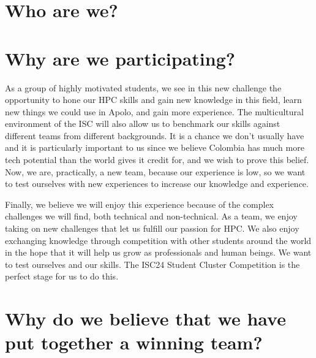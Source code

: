 \documentclass[11pt,a4paper,twocolumn]{article}
\begin{document}
\setlength{\parindent}{4em}
%



\section{Who are we?}

\section{Why are we participating?}

As a group of highly motivated students, we see in this new challenge the opportunity to hone our HPC skills and gain new knowledge in this field, learn new things we could use in Apolo, and gain more experience. The multicultural environment of the ISC will also allow us to benchmark our skills against different teams from different backgrounds. It is a chance we don’t usually have and it is particularly important to us since we believe Colombia has much more tech potential than the world gives it credit for, and we wish to prove this belief. Now, we are, practically, a new team, because our experience is low, so we want to test ourselves with new experiences to increase our knowledge and experience.

Finally, we believe we will enjoy this experience because of the complex challenges we will find, both technical and non-technical. As a team, we enjoy taking on new challenges that let us fulfill our passion for HPC. We also enjoy exchanging knowledge through competition with other students around the world in the hope that it will help us grow as professionals and human beings. We want to test ourselves and our skills. The ISC24 Student Cluster Competition is the perfect stage for us to do this.

\section{Why do we believe that we have put together a winning team?}
\end{document}
